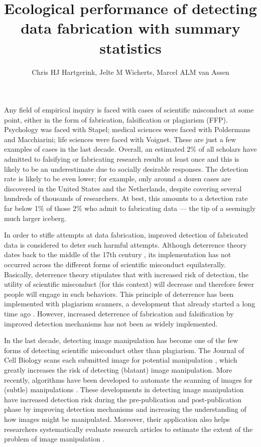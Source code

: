 \documentclass{article}
\title{Ecological performance of detecting data fabrication with summary statistics}
\author{Chris HJ Hartgerink, Jelte M Wicherts, Marcel ALM van Assen}
\begin{document}

\maketitle

Any field of empirical inquiry is faced with cases of scientific misconduct at some point, either in the form of fabrication, falsification or plagiarism (FFP). Psychology was faced with Stapel; medical sciences were faced with Poldermans and Macchiarini; life sciences were faced with Voignet. These are just a few examples of cases in the last decade. Overall, an estimated 2\% of all scholars have admitted to falsifying or fabricating research results at least once \citep{fanelli2009} and this is likely to be an underestimate due to socially desirable responses. The detection rate is likely to be even lower; for example, only around a dozen cases are discovered in the United States and the Netherlands, despite covering several hundreds of thousands of researchers. At best, this amounts to a detection rate far below 1\% of those 2\% who admit to fabricating data --- the tip of a seemingly much larger iceberg.

In order to stifle attempts at data fabrication, improved detection of fabricated data is considered to deter such harmful attempts. Although deterrence theory dates back to the middle of the 17th century \citep{leviathan}, its implementation has not occurred across the different forms of scientific misconduct equilaterally. Basically, deterrence theory stipulates that with increased risk of detection, the utility of scientific misconduct (for this context) will decrease and therefore fewer people will engage in such behaviors. This principle of deterrence has been implemented with plagiarism scanners, a development that already started a long time ago  \citep[e.g.,][]{Parker89computeralgorithms}. However, increased deterrence of fabrication and falsification by improved detection mechanisms has not been as widely implemented. 

In the last decade, detecting image manipulation has become one of the few forms of detecting scientific misconduct other than plagiarism. The Journal of Cell Biology scans each submitted image for potential manipulation \citep{The_Journal_of_Cell_Biology2015-vh}, which greatly increases the risk of detecting (blatant) image manipulation. More recently, algorithms have been developed to automate the scanning of images for (subtle) manipulations \citep{Koppers2016}. These developments in detecting image manipulation have increased detection risk during the pre-publication and post-publication phase by improving detection mechanisms and increasing the understanding of how images might be manipulated. Moreover, their application also helps researchers systematically evaluate research articles to estimate the extent of the problem of image manipulation \citep[4\% of all papers are estimated to contain manipulated images;][]{Bik06072016}. 
\end{document}
